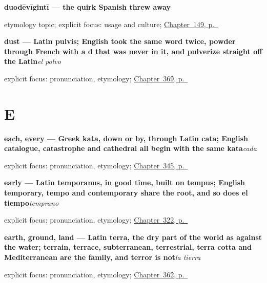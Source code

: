 \noindent\begin{minipage}[t]{\linewidth}
\raggedright
\textbf{duodēvīgintī — the quirk Spanish threw away}\par
\footnotesize etymology topic; explicit focus: usage and culture; \hyperref[ch:spanish-numbers-eleven-to-twenty]{Chapter~149, p.~\pageref*{ch:spanish-numbers-eleven-to-twenty}}
\end{minipage}\par\smallskip

\noindent\begin{minipage}[t]{\linewidth}
\raggedright
\textbf{dust — Latin pulvis; English took the same word twice, powder through French with a d that was never in it, and pulverize straight off the Latin}\enspace\emph{el polvo}\par
\footnotesize explicit focus: pronunciation, etymology; \hyperref[ch:el-rio-y-la-arena]{Chapter~369, p.~\pageref*{ch:el-rio-y-la-arena}}
\end{minipage}\par\smallskip

\section*{E}

\noindent\begin{minipage}[t]{\linewidth}
\raggedright
\textbf{each, every — Greek kata, down or by, through Latin cata; English catalogue, catastrophe and cathedral all begin with the same kata}\enspace\emph{cada}\par
\footnotesize explicit focus: pronunciation, etymology; \hyperref[ch:cada-y-mismo]{Chapter~345, p.~\pageref*{ch:cada-y-mismo}}
\end{minipage}\par\smallskip

\noindent\begin{minipage}[t]{\linewidth}
\raggedright
\textbf{early — Latin temporanus, in good time, built on tempus; English temporary, tempo and contemporary share the root, and so does el tiempo}\enspace\emph{temprano}\par
\footnotesize explicit focus: pronunciation, etymology; \hyperref[ch:anoche-y-todavia]{Chapter~322, p.~\pageref*{ch:anoche-y-todavia}}
\end{minipage}\par\smallskip

\noindent\begin{minipage}[t]{\linewidth}
\raggedright
\textbf{earth, ground, land — Latin terra, the dry part of the world as against the water; terrain, terrace, subterranean, terrestrial, terra cotta and Mediterranean are the family, and terror is not}\enspace\emph{la tierra}\par
\footnotesize explicit focus: pronunciation, etymology; \hyperref[ch:la-tierra-y-el-mar]{Chapter~362, p.~\pageref*{ch:la-tierra-y-el-mar}}
\end{minipage}\par\smallskip

